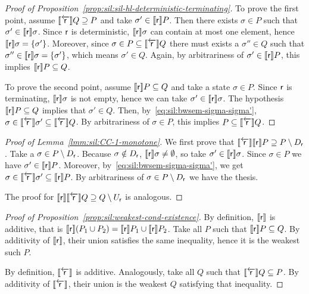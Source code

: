 \begin{proof}[Proof of Proposition~\ref{prop:sil:sil-hl-deterministic-terminating}]
	To prove the first point, assume $\llbracket\overleftarrow{\mathsf{r}}\rrbracket Q \supseteq P$ and take $\sigma' \in \llbracket\mathsf{r}\rrbracket P$. Then there exists $\sigma \in P$ such that $\sigma' \in \llbracket\mathsf{r}\rrbracket \sigma$. Since $\mathsf{r}$ is deterministic, $\llbracket\mathsf{r}\rrbracket \sigma$ can contain at most one element, hence $\llbracket\mathsf{r}\rrbracket \sigma = \{ \sigma' \}$. Moreover, since $\sigma \in P \subseteq \llbracket\overleftarrow{\mathsf{r}}\rrbracket Q$ there must exists a $\sigma'' \in Q$ such that $\sigma'' \in \llbracket\mathsf{r}\rrbracket \sigma = \{ \sigma' \}$, which means $\sigma' \in Q$. Again, by arbitrariness of $\sigma' \in \llbracket\mathsf{r}\rrbracket P$, this implies $\llbracket\mathsf{r}\rrbracket P \subseteq Q$.

	To prove the second point, assume $\llbracket\mathsf{r}\rrbracket P \subseteq Q$ and take a state $\sigma \in P$. Since $\mathsf{r}$ is terminating, $\llbracket\mathsf{r}\rrbracket \sigma$ is not empty, hence we can take $\sigma' \in \llbracket\mathsf{r}\rrbracket \sigma$. The hypothesis $\llbracket\mathsf{r}\rrbracket P \subseteq Q$ implies that $\sigma' \in Q$. Then, by~\eqref{eq:sil:bwsem-sigma-sigma'}, $\sigma \in \llbracket\overleftarrow{\mathsf{r}}\rrbracket \sigma' \subseteq \llbracket\overleftarrow{\mathsf{r}}\rrbracket Q$. By arbitrariness of $\sigma \in P$, this implies $P \subseteq \llbracket\overleftarrow{\mathsf{r}}\rrbracket Q$.
\end{proof}

\begin{proof}[Proof of Lemma~\ref{lmm:sil:CC-1-monotone}]
	We first prove that $\llbracket\overleftarrow{\mathsf{r}}\rrbracket \llbracket\mathsf{r}\rrbracket P \supseteq P \setminus D_{\mathsf{r}}$.
	Take a $\sigma \in P \setminus D_{\mathsf{r}}$. Because $\sigma \notin D_{\mathsf{r}}$, $\llbracket\mathsf{r}\rrbracket \sigma \neq \emptyset$, so take $\sigma' \in \llbracket\mathsf{r}\rrbracket \sigma$. Since $\sigma \in P$ we have $\sigma' \in \llbracket\mathsf{r}\rrbracket P$. Moreover, by~\eqref{eq:sil:bwsem-sigma-sigma'}, we get $\sigma \in \llbracket\overleftarrow{\mathsf{r}}\rrbracket \sigma' \subseteq \llbracket\mathsf{r}\rrbracket P$. By arbitrariness of $\sigma \in P \setminus D_{\mathsf{r}}$ we have the thesis.

	The proof for $\llbracket\mathsf{r}\rrbracket \llbracket\overleftarrow{\mathsf{r}}\rrbracket Q \supseteq Q \setminus U_{\mathsf{r}}$ is analogous.
\end{proof}

\begin{proof}[Proof of Proposition~\ref{prop:sil:weakest-cond-existence}]
	By definition, $\llbracket\mathsf{r}\rrbracket$ is additive, that is $\llbracket\mathsf{r}\rrbracket(P_1 \cup P_2) = \llbracket\mathsf{r}\rrbracket P_1 \cup \llbracket\mathsf{r}\rrbracket P_2$. Take all $P$ such that $\llbracket\mathsf{r}\rrbracket P \subseteq Q$. By additivity of $\llbracket\mathsf{r}\rrbracket$, their union satisfies the same inequality, hence it is the weakest such $P$.

	By definition, $\llbracket\overleftarrow{\mathsf{r}}\rrbracket$ is additive. Analogously, take all $Q$ such that $\llbracket\overleftarrow{\mathsf{r}}\rrbracket Q \subseteq P$. By additivity of $\llbracket\overleftarrow{\mathsf{r}}\rrbracket$, their union is the weakest $Q$ satisfying that inequality.
\end{proof}

